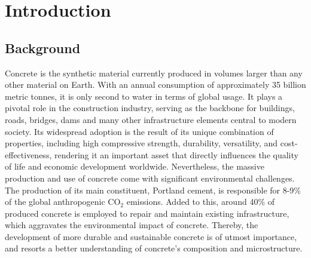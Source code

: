 
\chapter{Introduction} %

\label{Chapter1} %



\section{Background}
Concrete is the synthetic material currently produced in volumes larger than any other material on Earth. With an annual consumption of approximately 35 billion metric tonnes, it is only second to water in terms of global usage\supercite{mehta2014concrete, Monteiro2017}. It plays a pivotal role in the construction industry, serving as the backbone for buildings, roads, bridges, dams and many other infrastructure elements central to modern society. Its widespread adoption is the result of its unique combination of properties, including high compressive strength, durability, versatility, and cost-effectiveness\supercite{mehta2014concrete}, rendering it an important asset that directly influences the quality of life and economic development worldwide\supercite{VanDamme2018, Biernacki2017}. Nevertheless, the massive production and use of concrete come with significant environmental challenges. The production of its main constituent, Portland cement, is responsible for 8-9\% of the global anthropogenic CO$_2$ emissions\supercite{Monteiro2017}. Added to this, around 40\% of produced concrete is employed to repair and maintain existing infrastructure\supercite{mehta2014concrete}, which aggravates the environmental impact of concrete. Thereby, the development of more durable and sustainable concrete is of utmost importance, and resorts a better understanding of concrete's composition and microstructure. 

